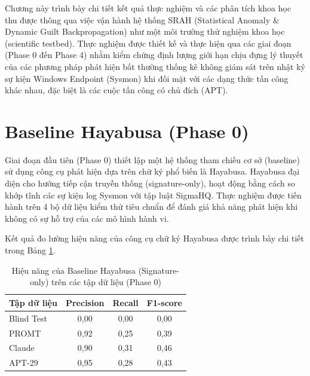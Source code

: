 \documentclass[../main.tex]{subfiles}
\begin{document}
Chương này trình bày chi tiết kết quả thực nghiệm và các phân tích khoa học thu được thông qua việc vận hành hệ thống SRAH (Statistical Anomaly \& Dynamic Guilt Backpropagation) như một môi trường thử nghiệm khoa học (scientific testbed). Thực nghiệm được thiết kế và thực hiện qua các giai đoạn (Phase 0 đến Phase 4) nhằm kiểm chứng định lượng giới hạn chịu đựng lý thuyết của các phương pháp phát hiện bất thường thống kê không giám sát trên nhật ký sự kiện Windows Endpoint (Sysmon) khi đối mặt với các dạng thức tấn công khác nhau, đặc biệt là các cuộc tấn công có chủ đích (APT).

\section{Baseline Hayabusa (Phase 0)}
\label{section:3.1}

Giai đoạn đầu tiên (Phase 0) thiết lập một hệ thống tham chiếu cơ sở (baseline) sử dụng công cụ phát hiện dựa trên chữ ký phổ biến là Hayabusa. Hayabusa đại diện cho hướng tiếp cận truyền thống (signature-only), hoạt động bằng cách so khớp tĩnh các sự kiện log Sysmon với tập luật SigmaHQ. Thực nghiệm được tiến hành trên 4 bộ dữ liệu kiểm thử tiêu chuẩn để đánh giá khả năng phát hiện khi không có sự hỗ trợ của các mô hình hành vi.

Kết quả đo lường hiệu năng của công cụ chữ ký Hayabusa được trình bày chi tiết trong Bảng \ref{table:hayabusa_baseline}.

\begin{table}[H]
\centering
\begin{tabular}{|l|c|c|c|}
\hline
\textbf{Tập dữ liệu} & \textbf{Precision} & \textbf{Recall} & \textbf{F1-score} \\ \hline
Blind Test & 0,00 & 0,00 & 0,00 \\ \hline
PROMT & 0,92 & 0,25 & 0,39 \\ \hline
Claude & 0,90 & 0,31 & 0,46 \\ \hline
APT-29 & 0,95 & 0,28 & 0,43 \\ \hline
\end{tabular}
\caption{Hiệu năng của Baseline Hayabusa (Signature-only) trên các tập dữ liệu (Phase 0)}
\label{table:hayabusa_baseline}
\end{table}
\end{document}
